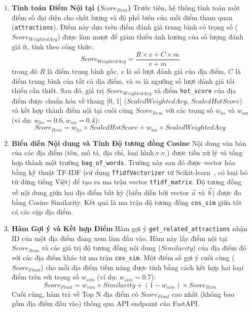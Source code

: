 \begin{enumerate}
 

\item  \textbf{Tính toán Điểm Nội tại ($Score_{Item}$)}
Trước tiên, hệ thống tính toán một điểm số đại diện cho chất lượng và độ phổ biến của mỗi điểm tham quan (\texttt{attractions}). Điểm này dựa trên điểm đánh giá trung bình có trọng số ($Score_{WeightedAvg}$) được làm mượt để giảm thiểu ảnh hưởng của số lượng đánh giá ít, tính theo công thức:
$$Score_{WeightedAvg} = \frac{R \times v + C \times m}{v + m}$$
trong đó $R$ là điểm trung bình gốc, $v$ là số lượt đánh giá của địa điểm, $C$ là điểm trung bình của tất cả địa điểm, và $m$ là ngưỡng số lượt đánh giá tối thiểu cần thiết. Sau đó, giá trị $Score_{WeightedAvg}$ và điểm \texttt{hot\_score} của địa điểm được chuẩn hóa về thang [0, 1] ($ScaledWeightedAvg$, $ScaledHotScore$) và kết hợp thành điểm nội tại cuối cùng $Score_{Item}$ với các trọng số $w_{hs}$ và $w_{wa}$ (ví dụ: $w_{hs}=0.6, w_{wa}=0.4$):
$$Score_{Item} = w_{hs} \times ScaledHotScore + w_{wa} \times ScaledWeightedAvg$$

\item  \textbf{Biểu diễn Nội dung và Tính Độ tương đồng Cosine}
Nội dung văn bản của các địa điểm (tên, mô tả, địa chỉ, loại hình,v.v.) được tiền xử lý và tổng hợp thành một trường \texttt{bag\_of\_words}. Trường này sau đó được vector hóa bằng kỹ thuật TF-IDF (sử dụng \texttt{TfidfVectorizer} từ Scikit-learn~\cite{sklearn_lib}, có loại bỏ từ dừng tiếng Việt) để tạo ra ma trận vector \texttt{tfidf\_matrix}. Độ tương đồng về nội dung giữa hai địa điểm bất kỳ (biểu diễn bởi vector $\vec{a}$ và $\vec{b}$) được đo bằng Cosine Similarity.
Kết quả là ma trận độ tương đồng \texttt{cos\_sim} giữa tất cả các cặp địa điểm.

    \item  \textbf{Hàm Gợi ý và Kết hợp Điểm}
Hàm gợi ý \texttt{get\_related\_attractions} nhận ID của một địa điểm đang xem làm đầu vào. Hàm này lấy điểm nội tại $Score_{Item}$ và các giá trị độ tương đồng nội dung ($Similarity$) của địa điểm đó với các địa điểm khác từ ma trận \texttt{cos\_sim}. Một điểm số gợi ý cuối cùng ($Score_{Final}$) cho mỗi địa điểm tiềm năng được tính bằng cách kết hợp hai loại điểm trên với trọng số $w_{sim}$ (ví dụ: $w_{sim}=0.7$):
$$Score_{Final} = w_{sim} \times Similarity + (1 - w_{sim}) \times Score_{Item}$$
Cuối cùng, hàm trả về Top N địa điểm có $Score_{Final}$ cao nhất (không bao gồm địa điểm đầu vào) thông qua API endpoint của FastAPI.
\end{enumerate}


